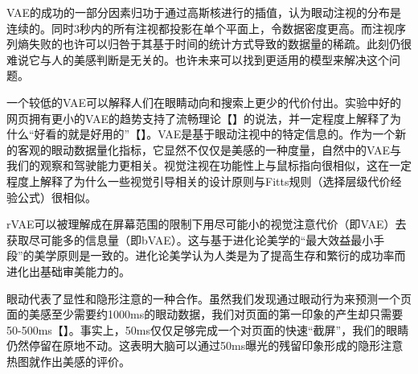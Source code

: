 VAE的成功的一部分因素归功于通过高斯核进行的插值，认为眼动注视的分布是连续的。同时3秒内的所有注视都投影在单个平面上，令数据密度更高。而注视序列熵失败的也许可以归咎于其基于时间的统计方式导致的数据量的稀疏。此刻仍很难说它与人的美感判断是无关的。也许未来可以找到更适用的模型来解决这个问题。

一个较低的VAE可以解释人们在眼睛动向和搜索上更少的代价付出。实验中好的网页拥有更小的VAE的趋势支持了流畅理论【】的说法，并一定程度上解释了为什么“好看的就是好用的”【】。VAE是基于眼动注视中的特定信息的。作为一个新的客观的眼动数据量化指标，它显然不仅仅是美感的一种度量，自然中的VAE与我们的观察和驾驶能力更相关。视觉注视在功能性上与鼠标指向很相似，这在一定程度上解释了为什么一些视觉引导相关的设计原则与Fitts规则（选择层级代价经验公式）很相似。

rVAE可以被理解成在屏幕范围的限制下用尽可能小的视觉注意代价（即VAE）去获取尽可能多的信息量（即bVAE）。这与基于进化论美学的“最大效益最小手段”的美学原则是一致的。进化论美学认为人类是为了提高生存和繁衍的成功率而进化出基础审美能力的。

眼动代表了显性和隐形注意的一种合作。虽然我们发现通过眼动行为来预测一个页面的美感至少需要约1000ms的眼动数据，我们对页面的第一印象的产生却只需要50-500ms【】。事实上，50ms仅仅足够完成一个对页面的快速“截屏”，我们的眼睛仍然停留在原地不动。这表明大脑可以通过50ms曝光的残留印象形成的隐形注意热图就作出美感的评价。
